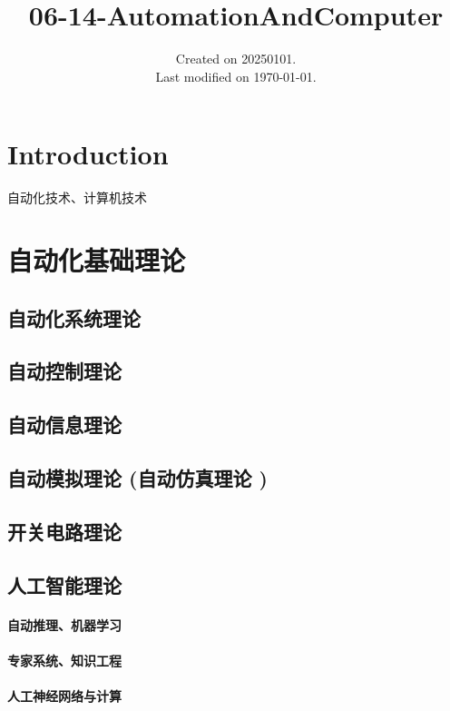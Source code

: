 \documentclass[UTF8]{../../ApplicationUniverse}
\begin{document}
\title{06-14-AutomationAndComputer}
\date{Created on 20250101.\\   Last modified on \today.}
\maketitle
\tableofcontents


\chapter{Introduction}


自动化技术、计算机技术





\chapter{自动化基础理论}
\section{自动化系统理论}
\section{自动控制理论}
\section{自动信息理论}
\section{自动模拟理论 (自动仿真理论 )}
\section{开关电路理论}
\section{人工智能理论}
    \subsubsection{自动推理、机器学习}
    \subsubsection{专家系统、知识工程}
    \subsubsection{人工神经网络与计算}
\end{document}
